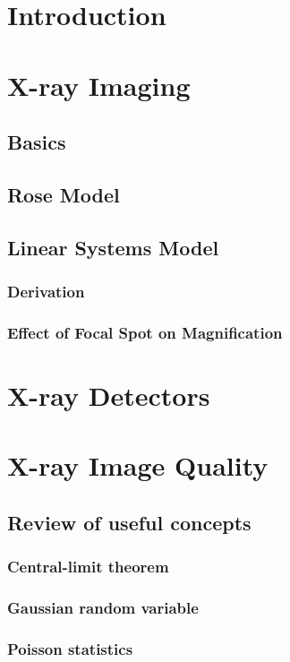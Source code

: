 \documentclass[11pt]{article}
\begin{document}
\tableofcontents

\newpage
\section{Introduction}

\newpage
\section{X-ray Imaging}
\subsection{Basics}
\subsection{Rose Model}
\subsection{Linear Systems Model}
\subsubsection{Derivation}
\subsubsection{Effect of Focal Spot on Magnification}

\newpage
\section{X-ray Detectors}

\newpage
\section{X-ray Image Quality}
\subsection{Review of useful concepts}
\subsubsection{Central-limit theorem}
\subsubsection{Gaussian random variable}
\subsubsection{Poisson statistics}
\end{document}
